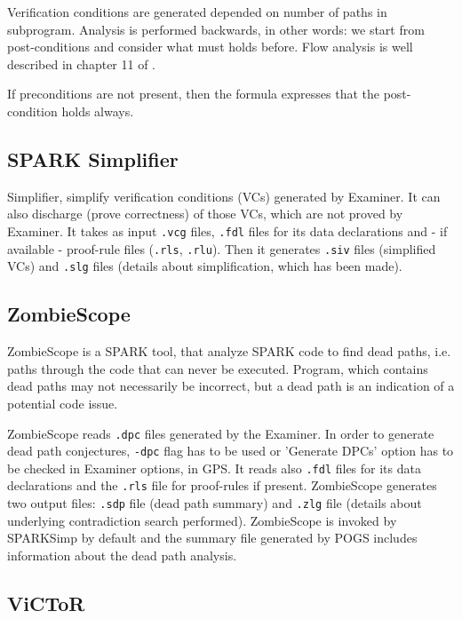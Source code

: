 Verification conditions are generated depended on number of paths in subprogram. Analysis is performed backwards, in other words: we start from post-conditions and consider what must holds before. Flow analysis is well described in chapter 11 of \cite{Barnes:Book}.

If preconditions are not present, then the formula expresses that the post-condition holds always.



\subsection{SPARK Simplifier}
\label{verification:simplifier}

Simplifier, simplify verification conditions (VCs) generated by Examiner. It can also discharge (prove correctness) of those VCs, which are not proved by Examiner. \cite{Simplifier:Online} It takes as input \lstinline{.vcg} files, \lstinline{.fdl} files for its data declarations and - if available - proof-rule files (\lstinline{.rls}, \lstinline{.rlu}). Then it generates \lstinline{.siv} files (simplified VCs) and \lstinline{.slg} files (details about simplification, which has been made).



\subsection{ZombieScope}
\label{verification:zombiescope}

ZombieScope is a SPARK tool, that analyze SPARK code to find dead paths, i.e. paths through the code that can never be executed. Program, which contains dead paths may not necessarily be incorrect, but a dead path is an indication of a potential code issue.

ZombieScope reads \lstinline{.dpc} files generated by the Examiner. In order to generate dead path conjectures, \lstinline{-dpc} flag has to be used or 'Generate DPCs' option has to be checked in Examiner options, in GPS. It reads also \lstinline{.fdl} files for its data declarations and the \lstinline{.rls} file for proof-rules if present. ZombieScope generates two output files: \lstinline{.sdp} file (dead path summary) and \lstinline{.zlg} file (details about underlying contradiction search performed). ZombieScope is invoked by SPARKSimp by default and the summary file generated by POGS includes information about the dead path analysis.


\subsection{ViCToR}
\label{verification:victor}

